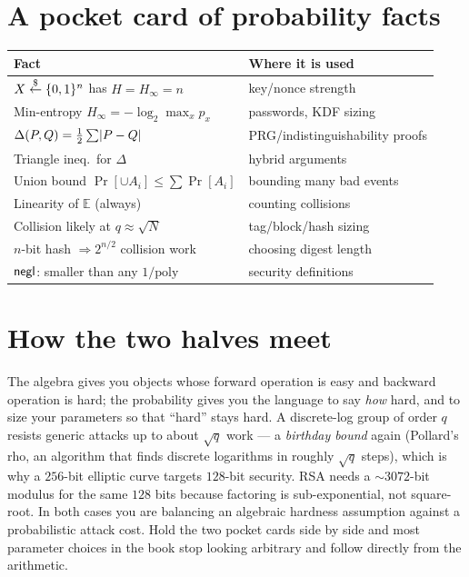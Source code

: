 \section{A pocket card of probability facts}
\label{ch41:probcard}

\begin{center}
\renewcommand{\arraystretch}{1.25}
\begin{tabular}{@{}p{}p{}@{}}
\toprule
\textbf{Fact} & \textbf{Where it is used} \\
\midrule
$X\stackrel{\$}{\gets}\{0,1\}^n$ has $H=H_\infty=n$ & key/nonce strength \\
Min-entropy $H_\infty=-\log_2\max_x p_x$ & passwords, KDF sizing \\
$\Delta(P,Q)=\tfrac12\sum\lvert P-Q\rvert$ & PRG/indistinguishability proofs \\
Triangle ineq.\ for $\Delta$ & hybrid arguments \\
Union bound $\Pr[\cup A_i]\le\sum\Pr[A_i]$ & bounding many bad events \\
Linearity of $\mathbb{E}$ (always) & counting collisions \\
Collision likely at $q\approx\sqrt N$ & tag/block/hash sizing \\
$n$-bit hash $\Rightarrow 2^{n/2}$ collision work & choosing digest length \\
$\mathsf{negl}$: smaller than any $1/\mathrm{poly}$ & security definitions \\
\bottomrule
\end{tabular}
\end{center}

\section{How the two halves meet}
\label{ch41:synthesis}

The algebra gives you objects whose forward operation is easy and backward
operation is hard; the probability gives you the language to say \emph{how} hard,
and to size your parameters so that ``hard'' stays hard. A discrete-log group of
order $q$ resists generic attacks up to about $\sqrt{q}$ work --- a \emph{birthday
bound} again (Pollard's rho, an algorithm that finds discrete logarithms in roughly $\sqrt{q}$ steps), which is why a $256$-bit elliptic curve targets
$128$-bit security. RSA needs a $\sim 3072$-bit modulus for the same $128$ bits
because factoring is sub-exponential, not square-root. In both cases you are
balancing an algebraic hardness assumption against a probabilistic attack cost.
Hold the two pocket cards side by side and most parameter choices in the book stop
looking arbitrary and follow directly from the arithmetic.

